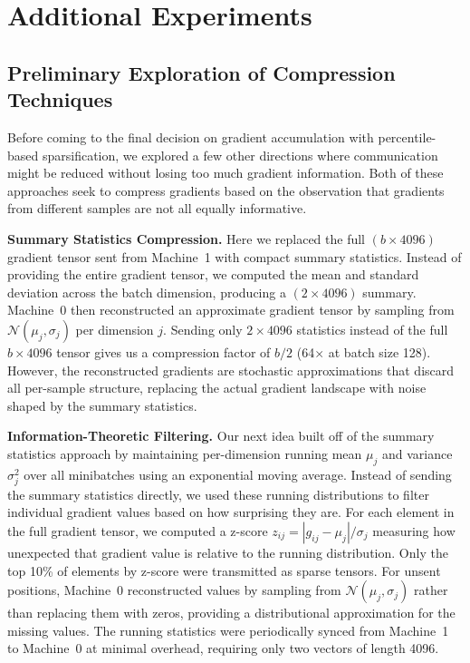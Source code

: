 \chapter{Additional Experiments}

\section{Preliminary Exploration of Compression Techniques}
\label{app:preliminary-compression}

Before coming to the final decision on gradient accumulation with percentile-based sparsification, we explored a few other directions where communication might be reduced without losing too much gradient information. Both of these approaches seek to compress gradients based on the observation that gradients from different samples are not all equally informative.

\textbf{Summary Statistics Compression.} Here we replaced the full $(b\times 4096)$ gradient tensor sent from Machine~1 with compact summary statistics. Instead of providing the entire gradient tensor, we computed the mean and standard deviation across the batch dimension, producing a $(2\times 4096)$ summary. Machine~0 then reconstructed an approximate gradient tensor by sampling from $\mathcal{N}(\mu_j, \sigma_j)$ per dimension $j$. Sending only $2\times 4096$ statistics instead of the full $b \times 4096$ tensor gives us a compression factor of $b/2$ (64$\times$ at batch size 128). However, the reconstructed gradients are stochastic approximations that discard all per-sample structure, replacing the actual gradient landscape with noise shaped by the summary statistics.

\textbf{Information-Theoretic Filtering.} Our next idea built off of the summary statistics approach by maintaining per-dimension running mean $\mu_j$ and variance $\sigma_j^2$ over all minibatches using an exponential moving average. Instead of sending the summary statistics directly, we used these running distributions to filter individual gradient values based on how surprising they are. For each element in the full gradient tensor, we computed a z-score $z_{ij} = |g_{ij} - \mu_j| / \sigma_j$ measuring how unexpected that gradient value is relative to the running distribution. Only the top 10\% of elements by z-score were transmitted as sparse tensors. For unsent positions, Machine~0 reconstructed values by sampling from $\mathcal{N}(\mu_j, \sigma_j)$ rather than replacing them with zeros, providing a distributional approximation for the missing values. The running statistics were periodically synced from Machine~1 to Machine~0 at minimal overhead, requiring only two vectors of length 4096.

